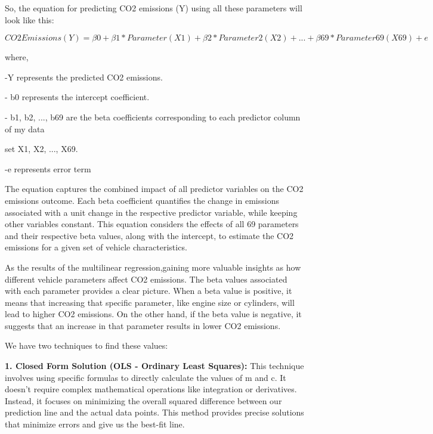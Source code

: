 \documentclass[12pt, a4paper,oneside]{book}
\numberwithin{equation}{section}
\begin{document}
So, the equation for predicting CO2 emissions (Y) using all these parameters will look like this:


\begin{equation}
   CO2 Emissions (Y) = \beta 0 + \beta 1 * Parameter (X1) + \beta 2 * Parameter2 (X2) + ... + \beta 69 * Parameter69 (X69) + e 
\end{equation}


where,

-Y represents the predicted CO2 emissions.

- b0 represents the intercept coefficient.

- b1, b2, ..., b69 are the beta coefficients corresponding to each predictor column of my data   

set X1, X2, ..., X69.

-e represents error term


The equation captures the combined impact of all predictor variables on the CO2 emissions outcome. Each beta coefficient quantifies the change in emissions associated with a unit change in the respective predictor variable, while keeping other variables constant.
This equation considers the effects of all 69 parameters and their respective beta values, along with the intercept, to estimate the CO2 emissions for a given set of vehicle characteristics.


As the results of the multilinear regression,gaining  more valuable insights as how different vehicle parameters affect CO2 emissions. The beta values associated with each parameter provides a clear picture. When a beta value is positive, it means that increasing that specific parameter, like engine size or cylinders, will lead to higher CO2 emissions. On the other hand, if the beta value is negative, it suggests that an increase in that parameter results in lower CO2 emissions.

\newline 

We have two techniques to find these values:

\textbf{1. Closed Form Solution (OLS - Ordinary Least Squares):} This technique involves using specific formulas to directly calculate the values of m and c. It doesn't require complex mathematical operations like integration or derivatives. Instead, it focuses on minimizing the overall squared difference between our prediction line and the actual data points. This method provides precise solutions that minimize errors and give us the best-fit line.
\end{document}
